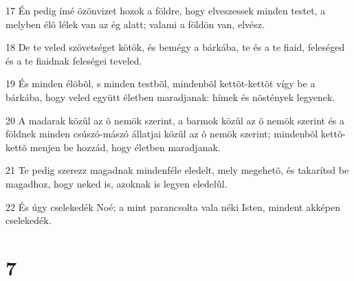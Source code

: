 \par 17 Én pedig ímé özönvizet hozok a földre, hogy elveszessek minden testet, a melyben élõ lélek van az ég alatt; valami a földön van, elvész.
\par 18 De te veled szövetséget kötök, és bemégy a bárkába, te és a te fiaid, feleséged és a te fiaidnak feleségei teveled.
\par 19 És minden élõbõl, s minden testbõl, mindenbõl kettõt-kettõt vígy be a bárkába, hogy veled együtt életben maradjanak: hímek és nõstények legyenek.
\par 20 A madarak közûl az õ nemök szerint, a barmok közûl az õ nemök szerint és a földnek minden csúszó-mászó állatjai közûl az õ nemök szerint; mindenbõl kettõ-kettõ menjen be hozzád, hogy életben maradjanak.
\par 21 Te pedig szerezz magadnak mindenféle eledelt, mely megehetõ, és takarítsd be magadhoz, hogy neked is, azoknak is legyen eledelûl.
\par 22 És úgy cselekedék Noé; a mint parancsolta vala néki Isten, mindent akképen cselekedék.

\chapter{7}

